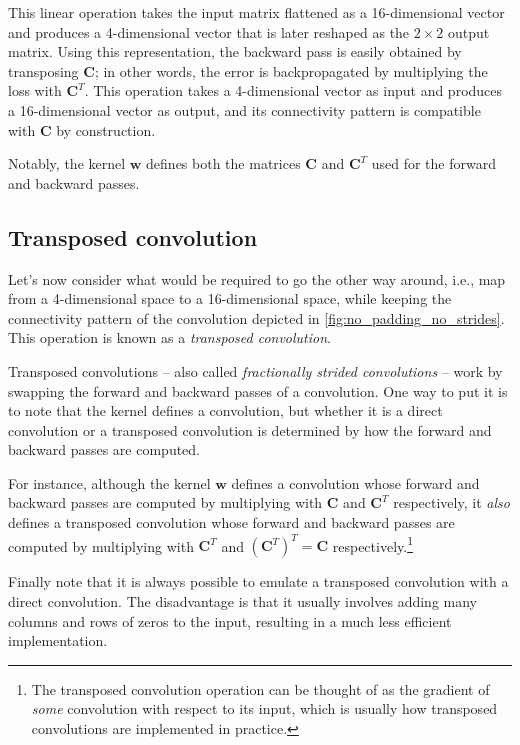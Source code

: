 This linear operation takes the input matrix flattened as a 16-dimensional
vector and produces a 4-dimensional vector that is later reshaped as the $2
\times 2$ output matrix.
Using this representation, the backward pass is easily obtained by transposing
$\mathbf{C}$; in other words, the error is backpropagated by multiplying the
loss with $\mathbf{C}^T$. This operation takes a 4-dimensional vector as input
and produces a 16-dimensional vector as output, and its connectivity pattern is
compatible with $\mathbf{C}$ by construction.

Notably, the kernel $\mathbf{w}$ defines both the matrices $\mathbf{C}$ and
$\mathbf{C}^T$ used for the forward and backward passes.

\subsection{Transposed convolution}

Let's now consider what would be required to go the other way around, i.e., map
from a 4-dimensional space to a 16-dimensional space, while keeping the
connectivity pattern of the convolution depicted in
\autoref{fig:no_padding_no_strides}. This operation is known as a {\em
transposed convolution}.

Transposed convolutions -- also called {\em fractionally strided convolutions\/}
-- work by swapping the forward and backward passes of a convolution. One way to
put it is to note that the kernel defines a convolution, but whether it is a
direct convolution or a transposed convolution is determined by how the forward
and backward passes are computed.

For instance, although the kernel $\mathbf{w}$ defines a convolution whose
forward and backward passes are computed by multiplying with $\mathbf{C}$ and
$\mathbf{C}^T$ respectively, it {\em also\/} defines a transposed convolution
whose forward and backward passes are computed by multiplying with
$\mathbf{C}^T$ and $(\mathbf{C}^T)^T = \mathbf{C}$ respectively.\footnote{The
    transposed convolution operation can be thought of as the gradient of {\em
    some\/} convolution with respect to its input, which is usually how
    transposed convolutions are implemented in practice.}

Finally note that it is always possible to emulate a transposed convolution with
a direct convolution. The disadvantage is that it usually involves adding many
columns and rows of zeros to the input, resulting in a much less efficient
implementation.

